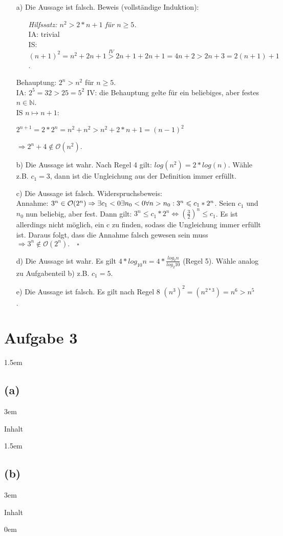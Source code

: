 \documentclass[11pt]{article}
\begin{document}
\begin{itemize}
	\item[a)]
		Die Aussage ist falsch.
		Beweis (vollständige Induktion):
		\begin{itemize}
			\item[]
				\textit{Hilfssatz: $n^2 > 2*n +1$ für $n\geq5$.\\}
				IA: trivial\\
				IS: $(n+1)^2 = n^2 + 2n +1 \overset{IV}{>} 2n+1+2n+1 = 4n+2 > 2n+3=2(n+1)+1$.
		\end{itemize}
		Behauptung: $2^n > n^2$ für $n\geq5$. \\
		IA: $2^5 = 32 > 25 = 5^2$
		IV: die Behauptung gelte für ein beliebiges, aber festes $n \in \mathbb{N} $. \\
		IS $n \mapsto n+1$: \\
		\begin{center}
			$ 2^{n+1} = 2*2^n = n^2 + n^2 > n^2 + 2*n+1=(n-1)^2 $
		\end{center}
		$\Rightarrow 2^n +4 \notin \mathcal{O}(n^2)$. \\
	\item[b)]
		Die Aussage ist wahr. Nach Regel 4 gilt: $log(n^2) = 2*log(n)$. Wähle z.B. $c_1=3$, dann ist die Ungleichung aus der Definition immer erfüllt.\\
	\item[c)]
		Die Aussage ist falsch. Widerspruchsbeweis:\\
		Annahme: $3^n \in \mathcal{O}(2^n) \\ \Rightarrow \exists c_1 <0 \exists n_0 < 0 \forall n > n_0: 3^n \leqslant c_1 *2^n$. Seien $c_1$ und $n_0$ nun beliebig, aber fest. Dann gilt: 
		$3^n \leqslant c_1 * 2^n \Leftrightarrow (\frac{3}{2})^n \leqslant c_1$. Es ist allerdings nicht möglich, ein c zu finden, sodass die Ungleichung immer erfüllt ist. Daraus folgt, dass die Annahme falsch gewesen sein muss $\Rightarrow 3^n \notin \mathcal{O}(2^n). \quad\square$\\
	\item[d)]
		Die Aussage ist wahr. Es gilt $4*log_{10} n = 4* \frac{log_2 n}{log_2 10}$ (Regel 5). Wähle analog zu Aufgabenteil b) z.B. $c_1 = 5$. \\
	\item[e)]
		Die Aussage ist falsch. Es gilt nach Regel 8 $(n^3)^2 = (n^{2*3}) = n^6 > n^5$\\.
\end{itemize}

\pagebreak

\section*{Aufgabe 3}

\leftskip 1.5em
\subsection*{(a)}
\leftskip 3em

Inhalt

\leftskip 1.5em
\subsection*{(b)}
\leftskip 3em

Inhalt

\leftskip 0em
\end{document}
